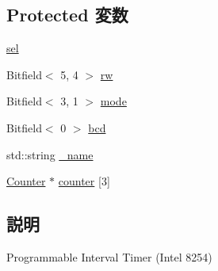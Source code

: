\subsection*{Protected 変数}
\begin{DoxyCompactItemize}
\item 
\hyperlink{classIntel8254Timer_a299de4c1b75292c5dbcdf22a59e6c455}{sel}
\item 
Bitfield$<$ 5, 4 $>$ \hyperlink{classIntel8254Timer_a08675539c603a90a51229153d9503881}{rw}
\item 
Bitfield$<$ 3, 1 $>$ \hyperlink{classIntel8254Timer_af707b2ca7be50bb0493eefc0535da367}{mode}
\item 
Bitfield$<$ 0 $>$ \hyperlink{classIntel8254Timer_a930c02c1e8a40525c1de8ee6bd037261}{bcd}
\item 
std::string \hyperlink{classIntel8254Timer_aaf2ed934b37cbbd236fdd1b01a5f5005}{\_\-name}
\item 
\hyperlink{classIntel8254Timer_1_1Counter}{Counter} $\ast$ \hyperlink{classIntel8254Timer_a5a8babfcbcfd4f4b9cfe0f4f0277bea6}{counter} \mbox{[}3\mbox{]}
\end{DoxyCompactItemize}


\subsection{説明}
Programmable Interval Timer (Intel 8254) 

